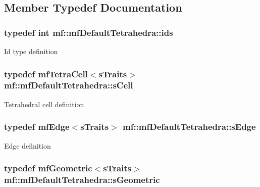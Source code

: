 \subsection{Member Typedef Documentation}
\hypertarget{structmf_1_1mfDefaultTetrahedra_a4343b74f9ba16bcb6e80a1a960d9b3cd}{
\subsubsection[{ids}]{\setlength{\rightskip}{0pt plus 5cm}typedef int {\bf mf::mfDefaultTetrahedra::ids}}}
\label{structmf_1_1mfDefaultTetrahedra_a4343b74f9ba16bcb6e80a1a960d9b3cd}
Id type definition \hypertarget{structmf_1_1mfDefaultTetrahedra_a291c0a2bf137a9e8264e2b89a499ba27}{
\subsubsection[{sCell}]{\setlength{\rightskip}{0pt plus 5cm}typedef {\bf mfTetraCell}$<${\bf sTraits}$>$ {\bf mf::mfDefaultTetrahedra::sCell}}}
\label{structmf_1_1mfDefaultTetrahedra_a291c0a2bf137a9e8264e2b89a499ba27}
Tetrahedral cell definition \hypertarget{structmf_1_1mfDefaultTetrahedra_a118dd6dbb6a4e47f3c8dd14a85af9970}{
\subsubsection[{sEdge}]{\setlength{\rightskip}{0pt plus 5cm}typedef {\bf mfEdge}$<${\bf sTraits}$>$ {\bf mf::mfDefaultTetrahedra::sEdge}}}
\label{structmf_1_1mfDefaultTetrahedra_a118dd6dbb6a4e47f3c8dd14a85af9970}
Edge definition \hypertarget{structmf_1_1mfDefaultTetrahedra_a4c97ceeb083d1e8d83b8e76f789eae12}{
\subsubsection[{sGeometric}]{\setlength{\rightskip}{0pt plus 5cm}typedef {\bf mfGeometric}$<${\bf sTraits}$>$ {\bf mf::mfDefaultTetrahedra::sGeometric}}}
\label{structmf_1_1mfDefaultTetrahedra_a4c97ceeb083d1e8d83b8e76f789eae12}
